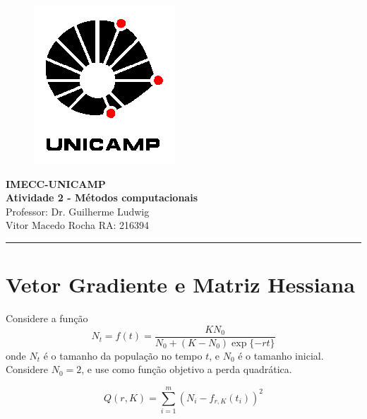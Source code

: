 \documentclass[a4paper,12pt,twoside]{article}
\begin{document}
\thispagestyle{empty}
	\begin{figure}[htb!]
		\begin{flushright}
			\includegraphics[scale=.3]{UNICAMP_logo.jpg} 
		\end{flushright}
	\end{figure}
	\vspace{-3.5cm}
	\hspace{1.5cm}
	\begin{flushleft}
	\begin{minipage}{15cm}
	\textbf{IMECC-UNICAMP\\
	Atividade 2 - Métodos computacionais}\\
	Professor: Dr. Guilherme Ludwig\\
	Vitor Macedo Rocha RA: 216394
	\end{minipage}
	\end{flushleft}
\noindent\rule{17cm}{0.4pt}

\section{Vetor Gradiente e Matriz Hessiana}
Considere a função 
\begin{equation}
N_t=f(t)=\frac{KN_0}{N_0 + (K-N_0)\exp{\{-rt\}}}
\end{equation}
onde $N_t$ é o tamanho da população no tempo $t$, e $N_0$ é o tamanho inicial. Considere $N_0=2$, e use como função objetivo a perda quadrática.

\begin{equation}
Q(r,K)=\sum_{i=1}^{m}(N_i - f_{r,K}(t_i))^2
\end{equation}
\end{document}
